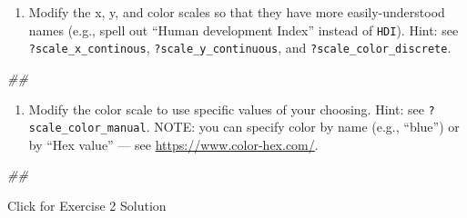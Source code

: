 \documentclass[
]{book}
\newenvironment{Shaded}{\begin{snugshade}}{\end{snugshade}}
\newcommand{\CommentTok}[1]{\textcolor[rgb]{0.56,0.35,0.01}{\textit{#1}}}
\providecommand{\tightlist}{%
  \setlength{\itemsep}{0pt}\setlength{\parskip}{0pt}}
\begin{document}
\begin{enumerate}
\def\labelenumi{\arabic{enumi}.}
\setcounter{enumi}{1}
\tightlist
\item
  Modify the x, y, and color scales so that they have more easily-understood names (e.g., spell out ``Human development Index'' instead of \texttt{HDI}). Hint: see \texttt{?scale\_x\_continous}, \texttt{?scale\_y\_continuous}, and \texttt{?scale\_color\_discrete}.
\end{enumerate}

\begin{Shaded}
\begin{Highlighting}[]
\CommentTok{\#\# }
\end{Highlighting}
\end{Shaded}

\begin{enumerate}
\def\labelenumi{\arabic{enumi}.}
\setcounter{enumi}{2}
\tightlist
\item
  Modify the color scale to use specific values of your choosing. Hint: see \texttt{?scale\_color\_manual}. NOTE: you can specify color by name (e.g., ``blue'') or by ``Hex value'' --- see \url{https://www.color-hex.com/}.
\end{enumerate}

\begin{Shaded}
\begin{Highlighting}[]
\CommentTok{\#\# }
\end{Highlighting}
\end{Shaded}

{Click for Exercise 2 Solution}
\end{document}
